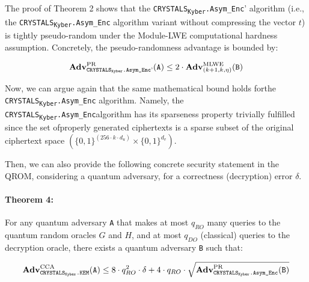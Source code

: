 \documentclass[runningheads]{llncs}
\numberwithin{equation}{section}
\begin{document}
    \noindent The proof of Theorem 2 shows that the \texorpdfstring{\texttt{CRYSTALS}\textsubscript{\texttt{Kyber}}\texttt{.Asym\_Enc}}\/' algorithm (i.e., the \texorpdfstring{\texttt{CRYSTALS}\textsubscript{\texttt{Kyber}}\texttt{.Asym\_Enc}}\/ algorithm variant without compressing the vector $t$) is tightly pseudo-random under the Module-LWE computational hardness assumption. Concretely, the pseudo-randomness advantage is bounded by:

    $$ {\text{\textbf{Adv}}}_{{\text{\texttt{CRYSTALS}\textsubscript{\texttt{Kyber}}\texttt{.Asym\_Enc}'}}}^{\text{PR}}\text{(\texttt{A})} \leq 2 \cdot {\text{\textbf{Adv}}}_{ ( k + 1, k, \eta ) }^{\text{MLWE}}\text{(\texttt{B})} $$

    \vspace{2ex}
    \noindent Now, we can argue again that the same mathematical bound holds for\break the \texorpdfstring{\texttt{CRYSTALS}\textsubscript{\texttt{Kyber}}\texttt{.Asym\_Enc}}\/ algorithm. Namely, the \texorpdfstring{\texttt{CRYSTALS}\textsubscript{\texttt{Kyber}}\texttt{.Asym\_Enc}}\/\break algorithm has its sparseness property trivially fulfilled since the set of\break properly generated ciphertexts is a sparse subset of the original ciphertext space $\left( { \{ 0, 1 \} }^{ ( 256 \cdot k \cdot {d}_{u}) } \times { \{ 0, 1 \} }^{{d}_{v}} \right)$.\

    \noindent Then, we can also provide the following concrete security statement in the QROM, considering a quantum adversary, for a correctness (decryption) error $\delta$.

    \paragraph{\textbf{Theorem 4:}} For any quantum adversary \texttt{A} that makes at most ${q}_{RO}$ many queries to the quantum random oracles $G$ and $H$, and at most ${q}_{DO}$ (classical) queries to the decryption oracle, there exists a quantum adversary \texttt{B} such that:

    $$ {\text{\textbf{Adv}}}_{{\text{\texttt{CRYSTALS}\textsubscript{\texttt{Kyber}}\texttt{.KEM}}}}^{\text{CCA}}\text{(\texttt{A})} \leq 8 \cdot {q}_{RO}^{2} \cdot \delta + 4 \cdot {q}_{RO} \cdot \sqrt{ {\text{\textbf{Adv}}}_{{\text{\texttt{CRYSTALS}\textsubscript{\texttt{Kyber}}\texttt{.Asym\_Enc}}}}^{\text{PR}}\text{(\texttt{B})} } $$
\end{document}
